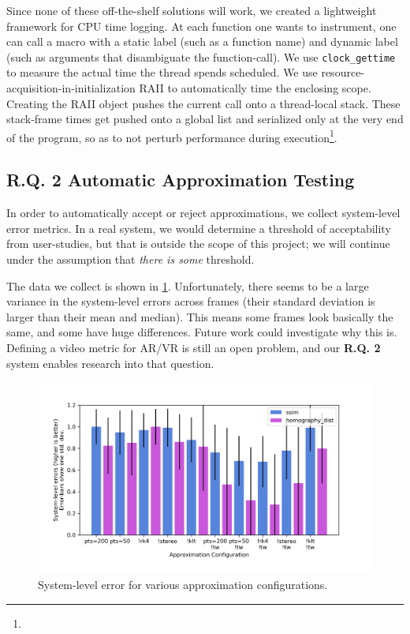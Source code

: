 Since none of these off-the-shelf solutions will work, we created a lightweight framework for CPU time logging.
At each function one wants to instrument, one can call a macro with a static label (such as a function name) and dynamic label (such as arguments that disambiguate the function-call).
We use \verb+clock_gettime+ to measure the actual time the thread spends scheduled.
We use resource-acquisition-in-initialization RAII to automatically time the enclosing scope.
Creating the RAII object pushes the current call onto a thread-local stack.
These stack-frame times get pushed onto a global list and serialized only at the very end of the program, so as to not perturb performance during execution\footnote{}.

\subsection{R.Q. 2 Automatic Approximation Testing}

In order to automatically accept or reject approximations, we collect system-level error metrics.
In a real system, we would determine a threshold of acceptability from user-studies, but that is outside the scope of this project;
    we will continue under the assumption that \textit{there is some} threshold.

The data we collect is shown in \cref{system-level-errors}.
Unfortunately, there seems to be a large variance in the system-level errors across frames (their standard deviation is larger than their mean and median).
This means some frames look basically the same, and some have huge differences.
Future work could investigate why this is.
Defining a video metric for AR/VR is still an open problem, and our \textbf{R.Q. 2} system enables research into that question.

\begin{figure}
  \label{system-level-errors}
  \caption{System-level error for various approximation configurations.}
  \includegraphics[width=\columnwidth]{system_errors.png}
\end{figure}

